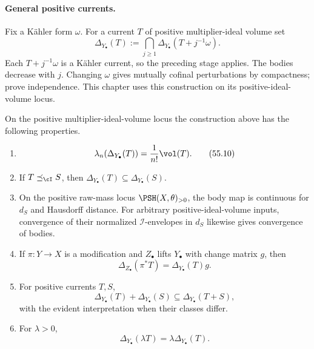 \paragraph{General positive currents.}
Fix a K\"ahler form $\omega$.
For a current $T$ of positive multiplier-ideal volume set
\[
 \Delta_{Y_\bullet}(T)
 :=\bigcap_{j\geq1}
      \Delta_{Y_\bullet}(T+j^{-1}\omega).
\tag{55.9}\label{eq:ok-trans-general}
\]
Each $T+j^{-1}\omega$ is a K\"ahler current, so the preceding stage
applies.  The bodies decrease with $j$.
Changing $\omega$ gives mutually cofinal perturbations by compactness;
\cite[Lemma~10.4.5 and Definition~10.4.4]{XiaBook} prove independence.
This chapter uses this construction on its positive-ideal-volume locus.

\begin{theorem}\label{thm:ok-transcendental-package}
On the positive multiplier-ideal-volume locus the construction above has
the following
properties.
\begin{enumerate}
\item
\[
 \lambda_n(\Delta_{Y_\bullet}(T))
       =\frac1{n!}\vol(T).
\tag{55.10}\label{eq:ok-trans-volume}
\]
\item If $T\preceq_{\cI}S$, then
$\Delta_{Y_\bullet}(T)\subseteq\Delta_{Y_\bullet}(S)$.
\item On the positive raw-mass locus $\PSH(X,\theta)_{>0}$, the body
map is continuous for $d_S$ and Hausdorff distance.
For arbitrary positive-ideal-volume inputs, convergence of their normalized
$\mathcal I$-envelopes in $d_S$ likewise gives convergence of bodies.
\item If $\pi:Y\to X$ is a modification and $Z_\bullet$ lifts
$Y_\bullet$ with change matrix $g$, then
\[
             \Delta_{Z_\bullet}(\pi^*T)
             =\Delta_{Y_\bullet}(T)g.
\tag{55.11}\label{eq:ok-birational-body}
\]
\item For positive currents $T,S$,
\[
 \Delta_{Y_\bullet}(T)+\Delta_{Y_\bullet}(S)
       \subseteq\Delta_{Y_\bullet}(T+S),
\tag{55.12}\label{eq:ok-minkowski}
\]
with the evident interpretation when their classes differ.
\item For $\lambda>0$,
\[
 \Delta_{Y_\bullet}(\lambda T)=\lambda\Delta_{Y_\bullet}(T).
\tag{55.12a}\label{eq:ok-body-homogeneity}
\]
\end{enumerate}
\par
\end{theorem}

